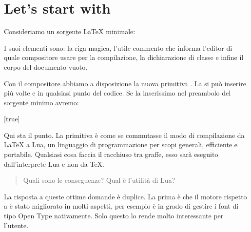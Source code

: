 

\chapter{Let's start with \LuaTeX}
\label{iChStart}

Consideriamo un sorgente \LaTeX{} minimale:

I suoi elementi sono: la riga magica, l'utile commento che informa l'editor di
quale compositore usare per la compilazione, la dichiarazione di classe e infine
il corpo del documento vuoto.

Con il compositore \LuaLaTeX{} abbiamo a disposizione la nuova primitiva
. La si può inserire più volte e in qualsiasi punto del codice. Se
la inserissimo nel preambolo del sorgente minimo avremo:

[true]%
%
%

Qui sta il punto. La primitiva  è come se commutasse il modo di
compilazione da \LaTeX{} a Lua, un linguaggio di programmazione per scopi
generali, efficiente e portabile. Qualsiasi cosa faccia il 
racchiuso tra graffe, esso sarà eseguito dall'interprete Lua e non da \TeX.

\begin{quotation}
Quali sono le conseguenze? Qual è l'utilità di Lua?
\end{quotation}

%
La risposta a queste ottime domande è duplice. La prima è che il motore
 rispetto a  è stato migliorato in molti aspetti, per
esempio è in grado di gestire i font di tipo Open Type nativamente. Solo questo
lo rende molto interessante per l'utente.

